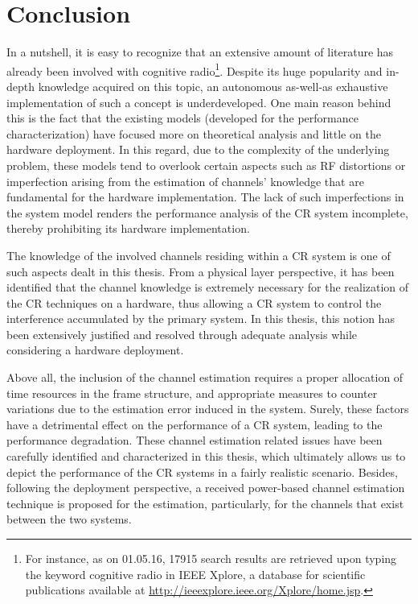 \chapter{Conclusion}
\label{chap:Con}

In a nutshell, it is easy to recognize that an extensive amount of literature has already been involved with cognitive radio\footnote{For instance, as on 01.05.16, 17915 search results are retrieved upon typing the keyword cognitive radio in IEEE Xplore, a database for scientific publications available at \url{http://ieeexplore.ieee.org/Xplore/home.jsp}.}. Despite its huge popularity and in-depth knowledge acquired on this topic, an autonomous as-well-as exhaustive implementation of such a concept is underdeveloped. One main reason behind this is the fact that the existing models (developed for the performance characterization) have focused more on theoretical analysis and little on the hardware deployment. In this regard, due to the complexity of the underlying problem, these models tend to overlook certain aspects such as RF distortions or imperfection arising from the estimation of channels' knowledge that are fundamental for the hardware implementation. The lack of such imperfections in the system model renders the performance analysis of the CR system incomplete, thereby prohibiting its hardware implementation. 

The knowledge of the involved channels residing within a CR system is one of such aspects dealt in this thesis. 
From a physical layer perspective, it has been identified that the channel knowledge is extremely necessary for the realization of the CR techniques on a hardware, thus allowing a CR system to control the interference accumulated by the primary system. In this thesis, this notion has been extensively justified and resolved through adequate analysis while considering a hardware deployment. %

Above all, the inclusion of the channel estimation requires a proper allocation of time resources in the frame structure, and appropriate measures to counter variations due to the estimation error induced in the system. Surely, these factors have a detrimental effect on the performance of a CR system, leading to the performance degradation. These channel estimation related issues have been carefully identified and characterized in this thesis, which ultimately allows us to depict the performance of the CR systems in a fairly realistic scenario. Besides, following the deployment perspective, a received power-based channel estimation technique is proposed for the estimation, particularly, for the channels that exist between the two systems. 

